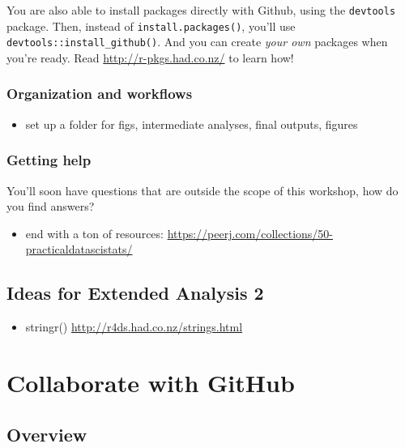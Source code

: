 \documentclass[]{book}
\providecommand{\tightlist}{%
  \setlength{\itemsep}{0pt}\setlength{\parskip}{0pt}}
\theoremstyle{definition}
\theoremstyle{definition}
\theoremstyle{definition}
\theoremstyle{remark}
\begin{document}
You are also able to install packages directly with Github, using the
\texttt{devtools} package. Then, instead of \texttt{install.packages()},
you'll use \texttt{devtools::install\_github()}. And you can create
\emph{your own} packages when you're ready. Read
\url{http://r-pkgs.had.co.nz/} to learn how!

\subsection{Organization and
workflows}\label{organization-and-workflows}

\begin{itemize}
\tightlist
\item
  set up a folder for figs, intermediate analyses, final outputs,
  figures
\end{itemize}

\subsection{Getting help}\label{getting-help}

You'll soon have questions that are outside the scope of this workshop,
how do you find answers?

\begin{itemize}
\tightlist
\item
  end with a ton of resources:
  \url{https://peerj.com/collections/50-practicaldatascistats/}
\end{itemize}

\section{Ideas for Extended Analysis
2}\label{ideas-for-extended-analysis-2}

\begin{itemize}
\tightlist
\item
  stringr() \url{http://r4ds.had.co.nz/strings.html}
\end{itemize}

\hypertarget{collaborating}{\chapter{Collaborate with
GitHub}\label{collaborating}}

\section{Overview}\label{overview-2}
\end{document}
